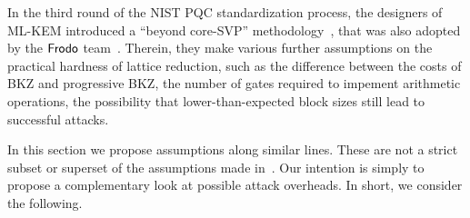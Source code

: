In the third round of the NIST PQC standardization process, the designers of ML-KEM introduced a ``beyond core-SVP'' methodology~\cite{NISTPQC-R3:CRYSTALS-Kyber20}, that was also adopted by the $\textsf{\upshape\mdseries Frodo}$ team~\cite{NISTPQC-R3:FrodoKEM20}. Therein, they make various further assumptions on the practical hardness of lattice reduction, such as the difference between the costs of BKZ and progressive BKZ, the number of gates required to impement arithmetic operations, the possibility that lower-than-expected block sizes still lead to successful attacks.

In this section we propose assumptions along similar lines. These are not a strict subset or superset of the assumptions made in~\cite{NISTPQC-R3:CRYSTALS-Kyber20}. Our intention is simply to propose a complementary look at possible attack overheads. In short, we consider the following.
